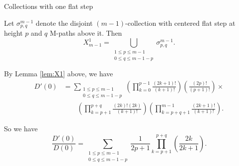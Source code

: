 \documentclass[12pt]{beamer}
\begin{document}
\begin{frame}[allowframebreaks]{Collections with one flat step}
\begin{lemma}\label{lem:X1}
Let $\sigma^{m-1}_{p,q}$ denote the disjoint $(m-1)$-collection with centered flat step at height $p$ and $q$ M-paths above it. Then
\begin{equation*}
X_{m-1}^1 = \bigcup\limits_{\substack{1\leq p \leq m-1 \\ 0\leq q \leq m - 1 -p}} \sigma^{m-1}_{p,q}.
\end{equation*}
\end{lemma}

\framebreak

By Lemma \ref{lem:X1} above, we have
\begin{align*}
D'(0) &= \sum\limits_{\substack{1\leq p\leq m-1\\0\leq q\leq m-1-p}}\left(\prod\limits_{k=0}^{p-1}\frac{(2k+1)!}{(k+1)!}\right)\left(\frac{(2p)!}{(p+1)!}\right) \times \\
&\qquad \left(\prod\limits_{k=p+1}^{p+q}\frac{(2k)!(2k)}{(k+1)!}\right)\left(\prod\limits_{k=p+q+1}^{m-1}\frac{(2k+1)!}{(k+1)!}\right).
\end{align*}

So we have
\begin{equation*}\label{eqn:D'/D}
\frac{D'(0)}{D(0)} = \sum\limits_{\substack{1\leq p \leq m-1 \\ 0 \leq q \leq m - 1 - p}}\frac{1}{2p+1}\prod\limits_{k=p+1}^{p+q}\left(\frac{2k}{2k+1}\right).
\end{equation*}

\end{frame}
\end{document}
